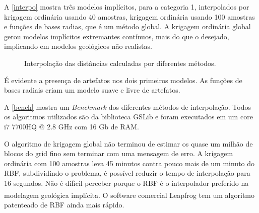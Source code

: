 A \autoref{interpo} mostra três modelos implícitos, para a categoria 1, interpolados por krigagem ordinária usando 40 amostras, krigagem ordinária usando 100 amostras e funções de bases radias, que é um método global. A krigagem ordinária global gerou modelos implícitos extremantes contínuos, mais do que o desejado, implicando em modelos geológicos não realistas. 

\begin{figure} 
    \caption{Interpolação das distâncias calculadas por diferentes métodos.} \label{interpo}
     \centering
\end{figure}

É evidente a presença de artefatos nos dois primeiros modelos. As funções de bases radiais criam um modelo suave e livre de artefatos. 

A \autoref{bench} mostra um \textit{Benchmark} dos diferentes métodos de interpolação. Todos os algoritmos utilizados são da biblioteca GSLib e foram executados em um core i7 7700HQ @ 2.8 GHz com 16 Gb de RAM.

O algoritmo de krigagem global não terminou de estimar os quase um milhão de blocos do grid fino sem terminar com uma mensagem de erro. A krigagem ordinária com 100 amostras leva 45 minutos contra pouco mais de um minuto do RBF, subdividindo o problema, é possível reduzir o tempo de interpolação para 16 segundos. Não é difícil perceber porque o RBF é o interpolador preferido na modelagem geológica implícita. O software comercial Leapfrog \textsuperscript{\textregistered} tem um algoritmo patenteado de RBF ainda mais rápido.

